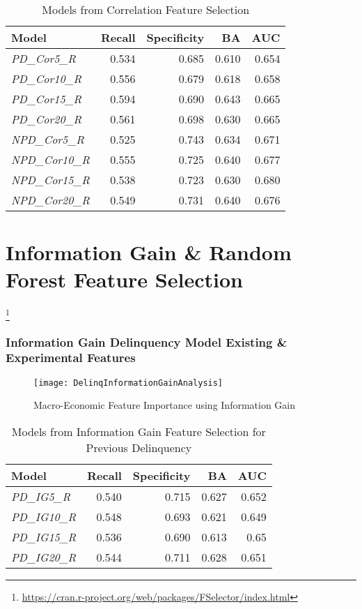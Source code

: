 \begin{table}[H]
\centering
\small
		\begin{tabular}{l r r r r}
			\hline
			\textbf{Model} & \textbf{Recall} & \textbf{Specificity} & \textbf{BA} & \textbf{AUC}  \\ \hline
			\textit{PD\_Cor5\_R}  & 0.534 & 0.685 & 0.610 & 0.654   \\ 
			\textit{PD\_Cor10\_R} & 0.556 & 0.679 & 0.618 & 0.658  \\ 
			\textit{PD\_Cor15\_R} & 0.594 & 0.690 & 0.643 & 0.665  \\
			\textit{PD\_Cor20\_R} & 0.561 & 0.698 & 0.630 & 0.665  \\\hline 
			
			\textit{NPD\_Cor5\_R}  & 0.525 & 0.743 & 0.634 & 0.671   \\ 
			\textit{NPD\_Cor10\_R} & 0.555 & 0.725 & 0.640 & 0.677  \\ 
			\textit{NPD\_Cor15\_R} & 0.538 & 0.723 & 0.630 & 0.680  \\
			\textit{NPD\_Cor20\_R} & 0.549 & 0.731 & 0.640 & 0.676  \\\hline 
		\end{tabular}
	\caption{Models from Correlation Feature Selection}
	\label{table:CorrModelResults}
\end{table}


\section{Information Gain \& Random Forest Feature Selection}

\footnote{\url{https://cran.r-project.org/web/packages/FSelector/index.html}}

\subsubsection{Information Gain Delinquency Model Existing \& Experimental Features}

\begin{figure}[H]
	\texttt{[image: DelinqInformationGainAnalysis]}
	\caption{Macro-Economic Feature Importance using Information Gain}
	\label{fig:DelinqInformationGainAnalysis}
\end{figure}


\begin{table}[H]
\centering
\small
		\begin{tabular}{l r r r r}
			\hline
			\textbf{Model} & \textbf{Recall} & \textbf{Specificity} & \textbf{BA} & \textbf{AUC}  \\ \hline
			\textit{PD\_IG5\_R} & 0.540 & 0.715 & 0.627 & 0.652   \\ 
			\textit{PD\_IG10\_R} & 0.548 & 0.693 & 0.621 & 0.649  \\ 
			\textit{PD\_IG15\_R} & 0.536 & 0.690 & 0.613 & 0.65  \\
			\textit{PD\_IG20\_R} & 0.544 & 0.711 & 0.628 & 0.651 \\\hline 
		\end{tabular}
	\caption{Models from Information Gain Feature Selection for Previous Delinquency}
	\label{table:InfoGainPDModelResults}
\end{table}



